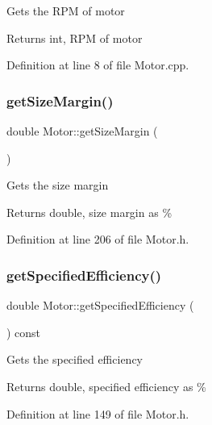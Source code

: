 Gets the R\+PM of motor

\begin{DoxyReturn}{Returns}
int, R\+PM of motor 
\end{DoxyReturn}


Definition at line 8 of file Motor.\+cpp.

\mbox{\label{class_motor_aff485f55bed5b58d1454ce5c71bc0729}} 
\subsubsection{\texorpdfstring{get\+Size\+Margin()}{getSizeMargin()}}
{\footnotesize\ttfamily double Motor\+::get\+Size\+Margin (\begin{DoxyParamCaption}{ }\end{DoxyParamCaption})\hspace{0.3cm}{\ttfamily [inline]}}

Gets the size margin

\begin{DoxyReturn}{Returns}
double, size margin as \% 
\end{DoxyReturn}


Definition at line 206 of file Motor.\+h.

\mbox{\label{class_motor_aca202d3c2061bd8c19e1819331033e36}} 
\subsubsection{\texorpdfstring{get\+Specified\+Efficiency()}{getSpecifiedEfficiency()}}
{\footnotesize\ttfamily double Motor\+::get\+Specified\+Efficiency (\begin{DoxyParamCaption}{ }\end{DoxyParamCaption}) const\hspace{0.3cm}{\ttfamily [inline]}}

Gets the specified efficiency

\begin{DoxyReturn}{Returns}
double, specified efficiency as \% 
\end{DoxyReturn}


Definition at line 149 of file Motor.\+h.

